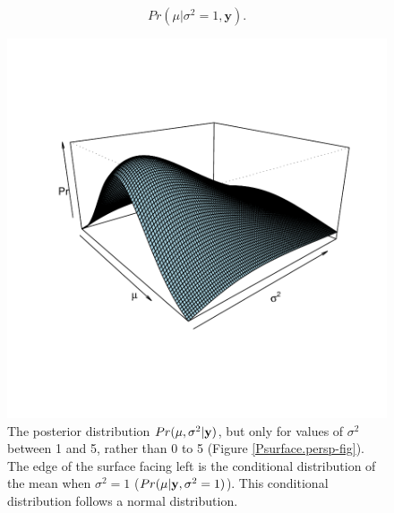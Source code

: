 \documentclass{article}
\begin{document}
\begin{equation}
Pr(\mu |\sigma^{2}=1, \bm{y}).
\end{equation}




\begin{figure}[!h]
\begin{center}
\includegraphics{Lecture1-055}
\end{center}
\caption{The posterior distribution $Pr(\mu, \sigma^{2} | {\bf y})$, but only for values of $\sigma^{2}$ between 1 and 5, rather than 0 to 5 (Figure \ref{Psurface.persp-fig}). The 
edge of the surface facing left is the conditional distribution of the mean when $\sigma^{2}=1$ ($Pr(\mu | {\bf y}, \sigma^{2}=1)$). This conditional distribution follows a normal distribution.}
\label{Psurface.persp2-fig}
\end{figure}
\end{document}
